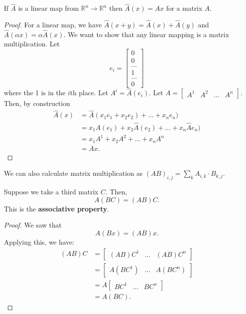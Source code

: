 \begin{theorem}
	If \( \hat{A} \) is a linear map from \( \mathbb{R}^{n} \to  \mathbb{R}^{n}   \) then \( \hat{A}(x) = Ax \) for a matrix \( A \).
\end{theorem}
\begin{proof}
	For a linear map, we have \( \hat{A}(x+y) = \hat{A}(x) + \hat{A}(y) \) and \( \hat{A}(\alpha x) = \alpha \hat{A}(x) \). We want to show that any linear mapping is a matrix multiplication. Let \[ e_i = \begin{bmatrix}
		0 \\ 0 \\ \ldots \\ 1 \\ \ldots \\ 0
	\end{bmatrix}\] where the 1 is in the \( i\)th place. Let \( A^{i}=\hat{A}(e_i)  \). Let \( A = \begin{bmatrix}
	A^{1} & A^{2} & \ldots  & A^{n} 
	\end{bmatrix} \). Then, by construction 
	\begin{align*}
		\hat{A}(x)&=\hat{A}(x_{1}e_{1} + x_{2}e_{2}) + \ldots  + x_ne_n ) \\ &= x_{1}\hat{A}(e_{1}) + x_{2}\hat{A}(e_{2}) + \ldots + x_n \hat{A}e_n)\\ &= x_{1}A^{1} + x_{2}A^{2} + \ldots  + x_nA^{n}\\  &= Ax
	.\end{align*}
\end{proof}

We can also calculate matrix multiplication as \( (AB)_{i,j} = \sum_k A_{i,k} \cdot B_{k,j}  \).

\begin{theorem}
	Suppose we take a third matrix \( C \). Then, \[
		A(BC) = (AB)C
	.\] This is the \textbf{associative property}.
\end{theorem}
\begin{proof}
	We saw that \[
		A(Bx) = (AB)x
	.\] Applying this, we have:
	\begin{align*}
		(AB)C &= \begin{bmatrix}
			(AB)C^{1} & \ldots & (AB)C^{n}  
		\end{bmatrix} \\
		&= \begin{bmatrix}
			A(BC^{1} ) & \ldots & A(BC^{n} )
		\end{bmatrix} \\
		&= A \begin{bmatrix}
			BC^{1} & \ldots & BC^{n}  
		\end{bmatrix}\\
		&= A(BC)
	.\end{align*}
\end{proof}

